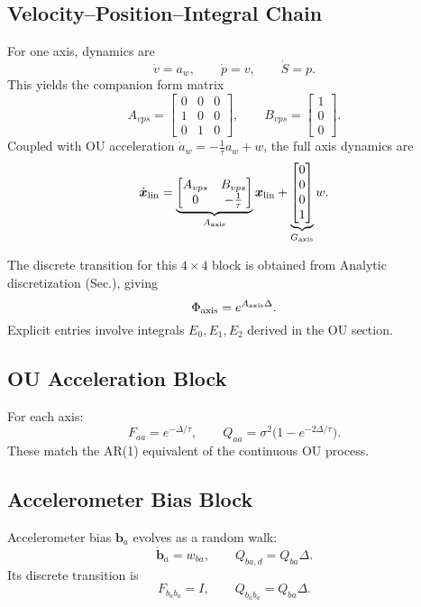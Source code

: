 \documentclass[10pt]{extarticle}
\begin{document}
\subsection{Velocity–Position–Integral Chain}
For one axis, dynamics are
\[
\dot v = a_w,\qquad
\dot p = v,\qquad
\dot S = p.
\]
This yields the companion form matrix
\begin{equation}
A_{vps} =
\begin{bmatrix}
0 & 0 & 0\\
1 & 0 & 0\\
0 & 1 & 0
\end{bmatrix},\qquad
B_{vps} = \begin{bmatrix}1\\0\\0\end{bmatrix}.
\label{eq:Avps}
\end{equation}
Coupled with OU acceleration $\dot a_w = -\tfrac{1}{\tau}a_w + w$, the full
axis dynamics are
\[
\dot{\bm x}_{\rm lin} = 
\underbrace{\begin{bmatrix}
A_{vps} & B_{vps}\\
0 & -\tfrac{1}{\tau}
\end{bmatrix}}_{A_{\rm axis}}
\bm x_{\rm lin} + 
\underbrace{\begin{bmatrix}0\\0\\0\\1\end{bmatrix}}_{G_{\rm axis}}w.
\]

The discrete transition for this $4\times 4$ block is obtained from
Analytic discretization (Sec.), giving
\begin{equation}
\Phi_{\rm axis} = e^{A_{\rm axis}\Delta}.
\label{eq:phi-axis}
\end{equation}
Explicit entries involve integrals $E_0,E_1,E_2$ derived in the OU section.

\subsection{OU Acceleration Block}
For each axis:
\begin{equation}
F_{aa} = e^{-\Delta/\tau},\qquad
Q_{aa} = \sigma^2 \big(1-e^{-2\Delta/\tau}\big).
\label{eq:ou-discrete}
\end{equation}
These match the AR(1) equivalent of the continuous OU process.

\subsection{Accelerometer Bias Block}
Accelerometer bias $\bm b_a$ evolves as a random walk:
\begin{equation}
\dot{\bm b}_a = w_{ba},\qquad
Q_{ba,d} = Q_{ba}\Delta.
\label{eq:accel-bias-rw}
\end{equation}
Its discrete transition is
\[
F_{b_ab_a} = I,\qquad
Q_{b_ab_a} = Q_{ba}\Delta.
\]
\end{document}
